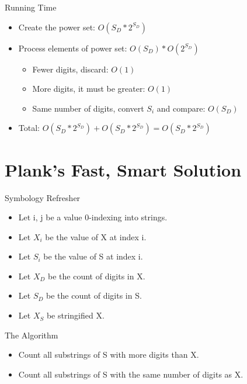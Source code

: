 \documentclass[10pt]{beamer}
\begin{document}
\begin{frame}{Running Time}
  \Large
  \begin{itemize} %
    \item Create the power set: $O(S_{D}*2^{S_{D}})$
    \item Process elements of power set: $O(S_{D}) * O(2^{S_{D}})$
      \begin{itemize}
        \large
        \item Fewer digits, discard: $O(1)$
        \item More digits, it must be greater: $O(1)$
        \item Same number of digits, convert $S_i$ and compare: $O(S_{D})$
      \end{itemize}
    \item Total: $O(S_{D}*2^{S_{D}}) + O(S_{D}*2^{S_{D}}) = O(S_{D}*2^{S_{D}})$
  \end{itemize}
\end{frame}

\section{Plank's Fast, Smart Solution}

\begin{frame}{Symbology Refresher}
  \Large
  \begin{itemize} %
    \item Let i, j be a value 0-indexing into strings.
    \item Let $X_{i}$ be the value of X at index i.
    \item Let $S_{i}$ be the value of S at index i.
    \item Let $X_{D}$ be the count of digits in X.
    \item Let $S_{D}$ be the count of digits in S.
    \item Let $X_{S}$ be stringified X.
  \end{itemize}
\end{frame}

\begin{frame}{The Algorithm}
  \huge
  \begin{itemize} %
    \item Count all substrings of S with more digits than X. \\
    \item Count all substrings of S with the same number of digits as X. \\
  \end{itemize}
\end{frame}
\end{document}
